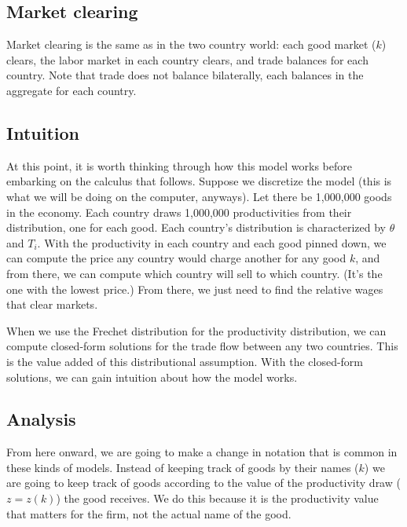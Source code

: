\documentclass[11pt, pdftex]{article}
\begin{document}
\subsection*{Market clearing}
Market clearing is the same as in the two country world: each good market ($k$) clears, the labor market in each country clears, and trade balances for each country.  Note that trade does not balance bilaterally, each balances in the aggregate for each country.
\subsection*{Intuition}
At this point, it is worth thinking through how this model works before embarking on the calculus that follows.  Suppose we discretize the model (this is what we will be doing on the computer, anyways).  Let there be 1,000,000 goods in the economy. Each country draws 1,000,000 productivities from their distribution, one for each good. Each country's distribution is characterized by $\theta$ and $T_i$.  With the productivity in each country and each good pinned down, we can compute the price any country would charge another for any good $k$, and from there, we can compute which country will sell to which country. (It's the one with the lowest price.) From there, we just need to find the relative wages that clear markets.

When we use the Frechet distribution for the productivity distribution, we  can compute closed-form solutions for the trade flow between any two countries.  This is the value added of this distributional assumption.  With the closed-form solutions, we can gain intuition about how the model works.
\subsection*{Analysis}
From here onward, we are going to make a change in notation that is common in these kinds of models. Instead of keeping track of goods by their names ($k$) we are going to keep track of goods according to the value of the productivity draw ($z=z(k)$) the good receives.  We do this because it is the productivity value that matters for the firm, not the actual name of the good.  \\

\\
\end{document}
